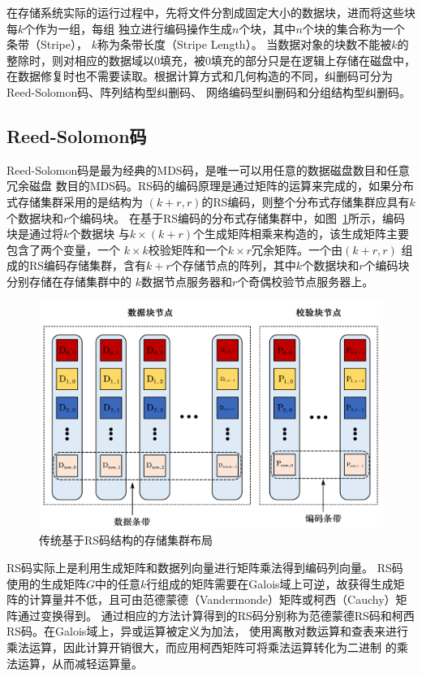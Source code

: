 在存储系统实际的运行过程中，先将文件分割成固定大小的数据块，进而将这些块每$k$个作为一组，每组
独立进行编码操作生成$n$个块，其中$n$个块的集合称为一个条带（Stripe）\cite{hafner2005matrix}，
$k$称为条带长度（Stripe Length）。
当数据对象的块数不能被$k$的整除时，则对相应的数据域以0填充，被0填充的部分只是在逻辑上存储在磁盘中，
在数据修复时也不需要读取。根据计算方式和几何构造的不同，纠删码可分为Reed-Solomon码、阵列结构型纠删码、
网络编码型纠删码和分组结构型纠删码。

\subsection{Reed-Solomon码}
Reed-Solomon码\cite{reed1960polynomial}是最为经典的MDS码，是唯一可以用任意的数据磁盘数目和任意冗余磁盘
数目的MDS码。RS码的编码原理是通过矩阵的运算来完成的，如果分布式存储集群采用的是结构为
$(k+r,r)$的RS编码，则整个分布式存储集群应具有$k$个数据块和$r$个编码块。
在基于RS编码的分布式存储集群中，如图~\ref{fig:con-1.3}所示，编码块是通过将$k$个数据块
与$k\times (k+r)$个生成矩阵相乘来构造的，该生成矩阵主要包含了两个变量，一个
$k \times k$校验矩阵和一个$k \times r$冗余矩阵\cite{li2016procode}。一个由$(k+r,r)$
组成的RS编码存储集群，含有$k+r$个存储节点的阵列，其中$k$个数据块和$r$个编码块分别存储在存储集群中的
$k$数据节点服务器和$r$个奇偶校验节点服务器上。

\begin{figure}[htbp]
	\centering
	\includegraphics [scale=0.5]{figures/1.3.pdf}
	\caption{传统基于RS码结构的存储集群布局}
	\label{fig:con-1.3}
\end{figure}

RS码实际上是利用生成矩阵和数据列向量进行矩阵乘法得到编码列向量。
RS码
使用的生成矩阵$G$中的任意$k$行组成的矩阵需要在Galois域上可逆，故获得生成矩阵的计算量并不低，且可由范德蒙德（Vandermonde）矩阵或柯西（Cauchy）矩阵\cite{roth1989mds}通过变换得到。
通过相应的方法计算得到的RS码分别称为范德蒙德RS码和柯西RS码。在Galois域上，异或运算被定义为加法，
使用离散对数运算和查表来进行乘法运算，因此计算开销很大，而应用柯西矩阵可将乘法运算转化为二进制
的乘法运算，从而减轻运算量。


